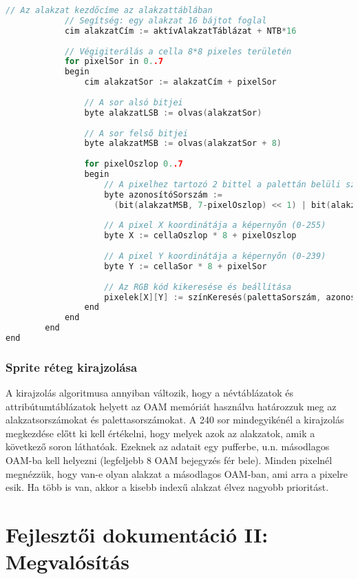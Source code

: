 \begin{lstlisting}[backgroundcolor = \color{white}, language=c, basicstyle=\scriptsize]
			// Az alakzat kezdőcíme az alakzattáblában
			// Segítség: egy alakzat 16 bájtot foglal
			cim alakzatCím := aktívAlakzatTáblázat + NTB*16
				
			// Végigiterálás a cella 8*8 pixeles területén
			for pixelSor in 0..7
			begin
				cim alakzatSor := alakzatCím + pixelSor
				
				// A sor alsó bitjei
				byte alakzatLSB := olvas(alakzatSor)
				
				// A sor felső bitjei		
				byte alakzatMSB := olvas(alakzatSor + 8)
				
				for pixelOszlop 0..7
				begin
					// A pixelhez tartozó 2 bittel a palettán belüli szín meghatározása
					byte azonosítóSorszám := 
					  (bit(alakzatMSB, 7-pixelOszlop) << 1) | bit(alakzatLSB, 7-pixelOszlop)
					
					// A pixel X koordinátája a képernyőn (0-255)
					byte X := cellaOszlop * 8 + pixelOszlop
					
					// A pixel Y koordinátája a képernyőn (0-239)
					byte Y := cellaSor * 8 + pixelSor
				
					// Az RGB kód kikeresése és beállítása
					pixelek[X][Y] := színKeresés(palettaSorszám, azonosítóSorszám)
				end
			end
		end
end


\end{lstlisting}

\subsection{Sprite réteg kirajzolása}

A kirajzolás algoritmusa annyiban változik, hogy a névtáblázatok és attribútumtáblázatok helyett az OAM memóriát használva határozzuk meg az alakzatsorszámokat és palettasorszámokat.
A 240 sor mindegyikénél a kirajzolás megkezdése előtt ki kell értékelni, hogy melyek azok az alakzatok, amik a következő soron láthatóak. Ezeknek az adatait egy pufferbe, u.n. másodlagos OAM-ba kell helyezni (legfeljebb 8 OAM bejegyzés fér bele). Minden pixelnél megnézzük, hogy van-e olyan alakzat a másodlagos OAM-ban, ami arra a pixelre esik. Ha több is van, akkor a kisebb indexű alakzat élvez nagyobb prioritást. 

\clearpage

\chapter{Fejlesztői dokumentáció II: Megvalósítás} %


